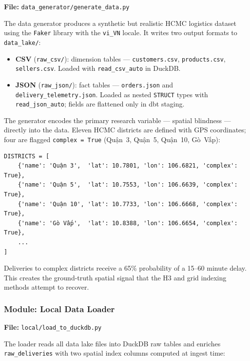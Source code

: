 \textbf{File:} \texttt{data\_generator/generate\_data.py}

The data generator produces a synthetic but realistic HCMC logistics dataset using the
\texttt{Faker} library with the \texttt{vi\_VN} locale. It writes two output formats to
\texttt{data\_lake/}:

\begin{itemize}
  \item \textbf{CSV} (\texttt{raw\_csv/}): dimension tables — \texttt{customers.csv},
        \texttt{products.csv}, \texttt{sellers.csv}. Loaded with
        \texttt{read\_csv\_auto} in DuckDB.
  \item \textbf{JSON} (\texttt{raw\_json/}): fact tables — \texttt{orders.json} and
        \texttt{delivery\_telemetry.json}. Loaded as nested \texttt{STRUCT} types with
        \texttt{read\_json\_auto}; fields are flattened only in dbt staging.
\end{itemize}

The generator encodes the primary research variable — spatial blindness — directly into
the data. Eleven HCMC districts are defined with GPS coordinates; four are flagged
\texttt{complex = True} (Quận~3, Quận~5, Quận~10, Gò~Vấp):

\begin{verbatim}
DISTRICTS = [
    {'name': 'Quận 3',  'lat': 10.7801, 'lon': 106.6821, 'complex': True},
    {'name': 'Quận 5',  'lat': 10.7553, 'lon': 106.6639, 'complex': True},
    {'name': 'Quận 10', 'lat': 10.7733, 'lon': 106.6668, 'complex': True},
    {'name': 'Gò Vấp',  'lat': 10.8388, 'lon': 106.6654, 'complex': True},
    ...
]
\end{verbatim}

Deliveries to complex districts receive a 65\% probability of a 15--60 minute delay.
This creates the ground-truth spatial signal that the H3 and grid indexing methods
attempt to recover.

\subsubsection{Module: Local Data Loader}
\label{sec:local_loader}

\textbf{File:} \texttt{local/load\_to\_duckdb.py}

The loader reads all data lake files into DuckDB raw tables and enriches
\texttt{raw\_deliveries} with two spatial index columns computed at ingest time:

